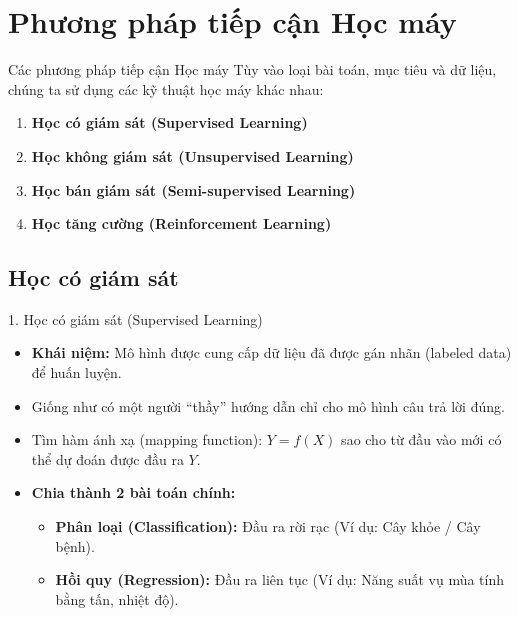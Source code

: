 \documentclass[aspectratio=169]{beamer}
\begin{document}
\section{Phương pháp tiếp cận Học máy}
\begin{frame}{Các phương pháp tiếp cận Học máy}
    Tùy vào loại bài toán, mục tiêu và dữ liệu, chúng ta sử dụng các kỹ thuật học máy khác nhau:
    \vspace{0.5cm}
    \begin{enumerate}
        \item \textbf{Học có giám sát (Supervised Learning)}
        \item \textbf{Học không giám sát (Unsupervised Learning)}
        \item \textbf{Học bán giám sát (Semi-supervised Learning)}
        \item \textbf{Học tăng cường (Reinforcement Learning)}
    \end{enumerate}
\end{frame}

\subsection{Học có giám sát}
\begin{frame}{1. Học có giám sát (Supervised Learning)}
    \begin{itemize}
        \item \textbf{Khái niệm:} Mô hình được cung cấp dữ liệu đã được gán nhãn (labeled data) để huấn luyện.
        \item Giống như có một người ``thầy'' hướng dẫn chỉ cho mô hình câu trả lời đúng.
        \item Tìm hàm ánh xạ (mapping function): $Y = f(X)$ sao cho từ đầu vào mới có thể dự đoán được đầu ra $Y$.
        \item \textbf{Chia thành 2 bài toán chính:}
        \begin{itemize}
            \item \textbf{Phân loại (Classification):} Đầu ra rời rạc (Ví dụ: Cây khỏe / Cây bệnh).
            \item \textbf{Hồi quy (Regression):} Đầu ra liên tục (Ví dụ: Năng suất vụ mùa tính bằng tấn, nhiệt độ).
        \end{itemize}
    \end{itemize}
\end{frame}
\end{document}

